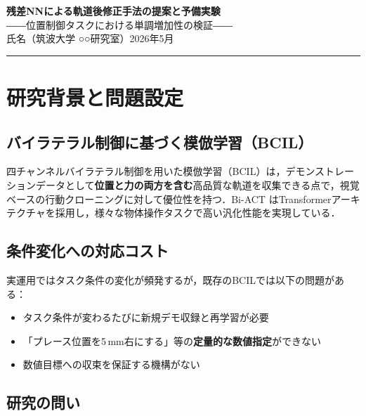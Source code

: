 \documentclass[a4paper,10pt]{jlreq}
\begin{document}
\begin{center}
  {\Large\bfseries 残差NNによる軌道後修正手法の提案と予備実験}\\[5pt]
  {\normalsize ――位置制御タスクにおける単調増加性の検証――}\\[8pt]
  {\small 氏名（筑波大学 ○○研究室）\hfill 2026年5月}
\end{center}
\hrule\vspace{6pt}

\section{研究背景と問題設定}

\subsection{バイラテラル制御に基づく模倣学習（BCIL）}

四チャンネルバイラテラル制御を用いた模倣学習（BCIL）は，デモンストレーションデータとして\textbf{位置と力の両方を含む}高品質な軌道を収集できる点で，視覚ベースの行動クローニングに対して優位性を持つ．Bi-ACT \cite{Buamanee2024} はTransformerアーキテクチャを採用し，様々な物体操作タスクで高い汎化性能を実現している．

\subsection{条件変化への対応コスト}

実運用ではタスク条件の変化が頻発するが，既存のBCILでは以下の問題がある：
\begin{itemize}
  \item タスク条件が変わるたびに新規デモ収録と再学習が必要
  \item 「プレース位置を5\,mm右にする」等の\textbf{定量的な数値指定}ができない
  \item 数値目標への収束を保証する機構がない
\end{itemize}

\subsection{研究の問い}

\begin{center}
  \fboxsep=6pt
\end{center}
\end{document}
